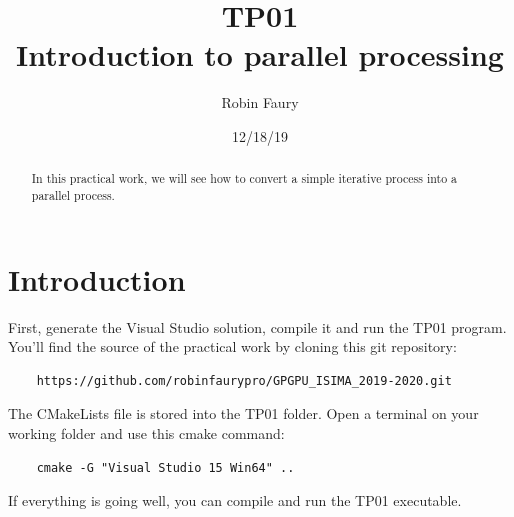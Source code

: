 \documentclass{article}
\begin{document}
\title{TP01\\Introduction to parallel processing}
\author{Robin Faury}
\date{12/18/19}
\maketitle

\begin{abstract}
	In this practical work, we will see how to convert a simple iterative process into a parallel process.
\end{abstract}


\section{Introduction}
First, generate the Visual Studio solution, compile it and run the TP01 program.
You'll find the source of the practical work by cloning this git repository:
\begin{lstlisting}
	https://github.com/robinfaurypro/GPGPU_ISIMA_2019-2020.git
\end{lstlisting}
The CMakeLists file is stored into the TP01 folder. Open a terminal on your working folder and use this cmake command:
\begin{lstlisting}
	cmake -G "Visual Studio 15 Win64" ..
\end{lstlisting}
If everything is going well, you can compile and run the TP01 executable.
\end{document}
